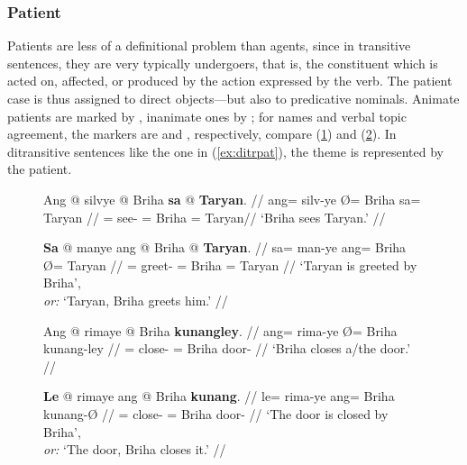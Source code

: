 
\subsubsection{Patient}

Patients are less of a definitional problem than agents, since in transitive
sentences, they are very typically undergoers, that is, the constituent which
is acted on, affected, or produced by the action expressed by the verb. The
patient case is thus assigned to direct objects---but also to predicative
nominals. Animate patients are marked by , inanimate ones by
; for names and verbal topic agreement, the markers are
 and , respectively, compare (\ref{ex:patmarking1})
and (\ref{ex:patmarking2}). In ditransitive sentences like the one in
(\ref{ex:ditrpat}), the theme is represented by the patient.

\begin{figure}
\pex\label{ex:patmarking1}
\a\begingl
	\gla Ang @ silvye {} @ Briha \textbf{sa} @ \textbf{Taryan}. //
	\glb ang= silv-ye Ø= Briha sa= Taryan //
	\glc \AgtT{}= see-\TsgF{} \Top{}= Briha \Parg{}= Taryan//
	\glft `Briha sees Taryan.' //
\endgl

\a\begingl
	\gla \textbf{Sa} @ manye ang @ Briha {} @ \textbf{Taryan}. //
	\glb sa= man-ye ang= Briha Ø= Taryan //
	\glc \PatT{}= greet-\TsgF{} \Aarg{}= Briha \Top{}= Taryan //
	\glft `Taryan is greeted by Briha',\\
		\textit{or:} `Taryan, Briha greets him.' //
\endgl
\xe
\end{figure}

\begin{figure}
\pex\label{ex:patmarking2}
\a\begingl
	\gla Ang @ rimaye {} @ Briha \textbf{kunangley}. //
	\glb ang= rima-ye Ø= Briha kunang-ley //
	\glc \AgtT{}= close-\TsgF{} \Top{}= Briha door-\PargI{} //
	\glft `Briha closes a/the door.' //
\endgl

\a\begingl
	\gla \textbf{Le} @ rimaye ang @ Briha \textbf{kunang}. //
	\glb le= rima-ye ang= Briha kunang-Ø //
	\glc \PatTI{}= close-\TsgF{} \Aarg{}= Briha door-\Top{} //
	\glft `The door is closed by Briha',\\
		\textit{or:} `The door, Briha closes it.' //
\endgl
\xe
\end{figure}

